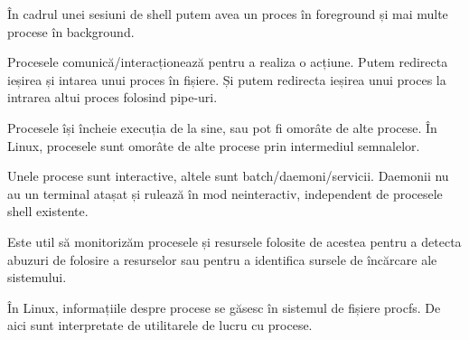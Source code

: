 În cadrul unei sesiuni de shell putem avea un proces în foreground și mai multe
procese în background.

Procesele comunică/interacționează pentru a realiza o acțiune. Putem redirecta
ieșirea și intarea unui proces în fișiere. Și putem redirecta ieșirea unui
proces la intrarea altui proces folosind pipe-uri.

Procesele își încheie execuția de la sine, sau pot fi omorâte de alte procese.
În Linux, procesele sunt omorâte de alte procese prin intermediul semnalelor.

Unele procese sunt interactive, altele sunt batch/daemoni/servicii. Daemonii nu
au un terminal atașat și rulează în mod neinteractiv, independent de procesele
shell existente.

Este util să monitorizăm procesele și resursele folosite de acestea pentru a
detecta abuzuri de folosire a resurselor sau pentru a identifica sursele de
încărcare ale sistemului.

În Linux, informațiile despre procese se găsesc în sistemul de fișiere procfs. De
aici sunt interpretate de utilitarele de lucru cu procese.

